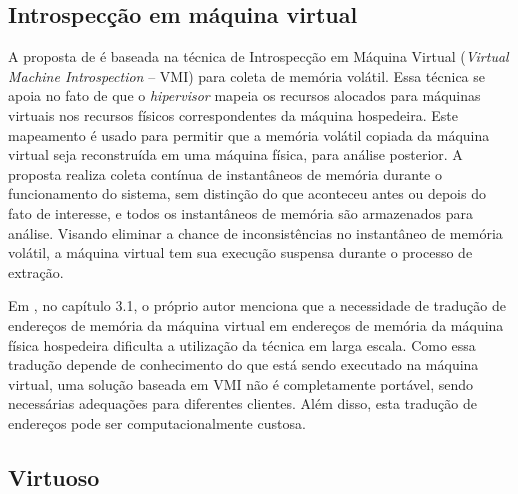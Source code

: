 \subsection{Introspecção em máquina virtual}
\label{sec:VMI}

A proposta de \cite{PoiselVMI:2013} é baseada na técnica de Introspecção em Máquina Virtual (\textit{Virtual Machine Introspection} -- VMI) para coleta de memória volátil. 
%
Essa técnica se apoia no fato de que o \textit{hipervisor} mapeia os recursos alocados para máquinas virtuais nos recursos físicos correspondentes da máquina hospedeira.
%
Este mapeamento é usado para permitir que a memória volátil copiada da máquina virtual seja reconstruída em uma máquina física, para análise posterior.
%
A proposta realiza coleta contínua de instantâneos de memória durante o funcionamento do sistema, sem distinção do que aconteceu antes ou depois do fato de interesse, e todos os instantâneos de memória são armazenados para análise.
%
Visando eliminar a chance de inconsistências no instantâneo de memória volátil, a máquina virtual tem sua execução suspensa durante o processo de extração.


Em \cite{PoiselVMI:2013}, no capítulo 3.1, o próprio autor menciona que a necessidade de tradução de endereços de memória da máquina virtual em endereços de memória da máquina física hospedeira dificulta a utilização da técnica em larga escala.
%
Como essa tradução depende de conhecimento do que está sendo executado na máquina virtual, uma solução baseada em VMI não é completamente portável, sendo necessárias adequações para diferentes clientes.
%
Além disso, esta tradução de endereços pode ser computacionalmente custosa.%
%

\subsection{Virtuoso}
\label{sec:virtuoso}

